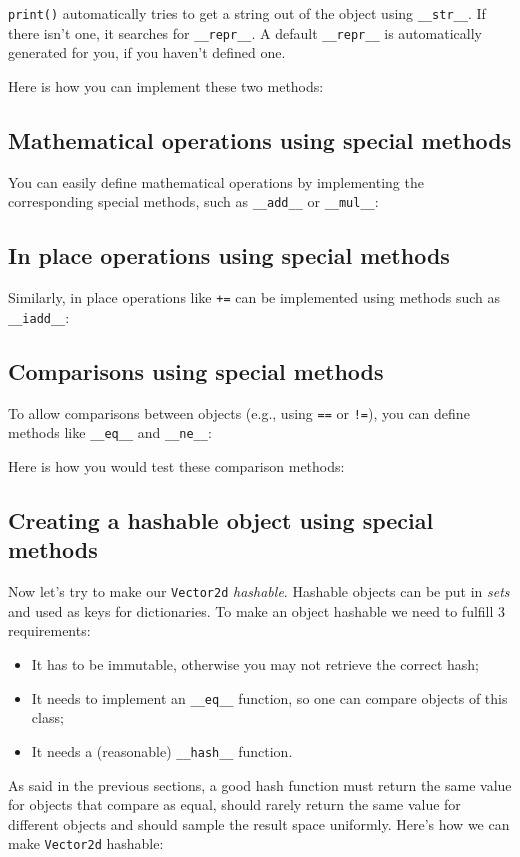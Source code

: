 \texttt{print()} automatically tries to get a string out of the object using \texttt{\_\_str\_\_}. If there isn't one, it searches for \texttt{\_\_repr\_\_}. A default \texttt{\_\_repr\_\_} is automatically generated for you, if you haven't defined one.

Here is how you can implement these two methods:



\subsection{Mathematical operations using special methods}
You can easily define mathematical operations by implementing the corresponding special methods, such as \texttt{\_\_add\_\_} or \texttt{\_\_mul\_\_}:



\subsection{In place operations using special methods}
Similarly, in place operations like \texttt{+=} can be implemented using methods such as \texttt{\_\_iadd\_\_}:



\subsection{Comparisons using special methods}
To allow comparisons between objects (e.g., using \texttt{==} or \texttt{!=}), you can define methods like \texttt{\_\_eq\_\_} and \texttt{\_\_ne\_\_}:


\hrulefill

Here is how you would test these comparison methods:



\subsection{Creating a hashable object using special methods}
Now let's try to make our \texttt{Vector2d} \textit{hashable}. Hashable objects can be put in \textit{sets} and used as keys for dictionaries.
To make an object hashable we need to fulfill 3 requirements:
\begin{itemize}
    \item[-] It has to be immutable, otherwise you may not retrieve the correct hash;
    \item[-] It needs to implement an \texttt{\_\_eq\_\_} function, so one can compare objects of this class;
    \item[-] It needs a (reasonable) \texttt{\_\_hash\_\_} function.
\end{itemize}
As said in the previous sections, a good hash function must return the same value for objects that compare as equal, should rarely return the same value for different objects and should sample the result space uniformly. Here's how we can make \texttt{Vector2d} hashable:

